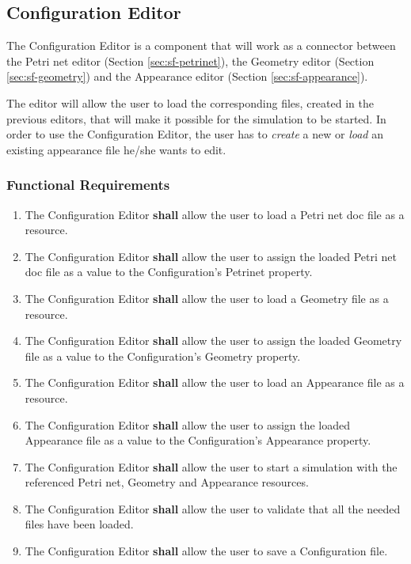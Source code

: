 \subsection{Configuration Editor}

The Configuration Editor is a component that will work as a connector between the Petri net editor (Section \ref{sec:sf-petrinet}), the Geometry editor (Section \ref{sec:sf-geometry}) and the Appearance editor (Section \ref{sec:sf-appearance}). 

The editor will allow the user to load the corresponding files, created in the previous editors, that will make it possible for the simulation to be started. In order to use the Configuration Editor, the user has to \textit{create} a new or \textit{load} an existing appearance file he/she wants to edit.

\subsubsection{Functional Requirements}

\begin{enumerate}
	\item The Configuration Editor \textbf{shall} allow the user to load a Petri net doc file as a resource.
	\item The Configuration Editor \textbf{shall} allow the user to assign the loaded Petri net doc file as a value to the Configuration's Petrinet property. 
	\item The Configuration Editor \textbf{shall} allow the user to load a Geometry file as a resource.
	\item The Configuration Editor \textbf{shall} allow the user to assign the loaded Geometry file as a value to the Configuration's Geometry property.  
	\item The Configuration Editor \textbf{shall} allow the user to load an Appearance file as a resource.
	\item The Configuration Editor \textbf{shall} allow the user to assign the loaded Appearance file as a value to the Configuration's Appearance property. 
	\item The Configuration Editor \textbf{shall} allow the user to start a simulation with the referenced Petri net, Geometry and Appearance resources.
	\item The Configuration Editor \textbf{shall} allow the user to validate that all the needed files have been loaded.
	\item The Configuration Editor \textbf{shall} allow the user to save a Configuration file.
\end{enumerate}

